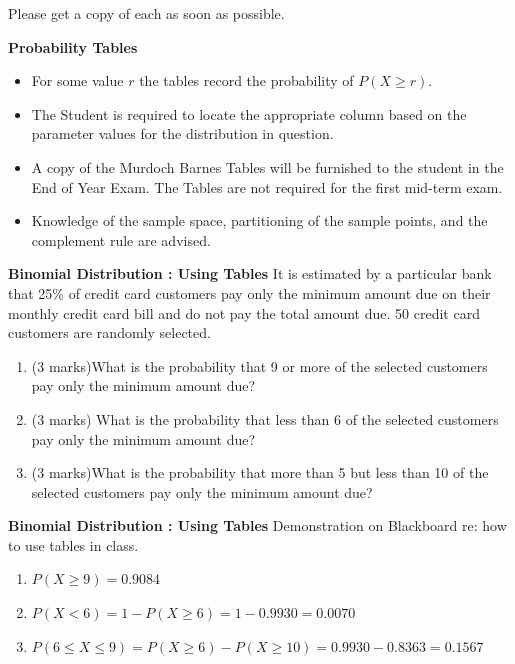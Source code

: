 \documentclass[]{report}
\begin{document}
{{Please get a copy of each as soon as possible.

}

{
\textbf{Probability Tables}
\begin{itemize}
\item  For some value $r$ the tables record the probability of $P(X \geq r)$.
\item  The Student is required to locate the appropriate column based on the parameter values for the distribution in question.
\item  A copy of the Murdoch Barnes Tables will be furnished to the student in the End of Year Exam. The Tables are not required for the first mid-term exam.
\item  Knowledge of the sample space, partitioning of the sample points, and the complement rule are advised.
\end{itemize}
}


{
\textbf{Binomial Distribution : Using Tables}
It is estimated by a particular bank that 25\% of credit card customers pay only the minimum amount due on their monthly credit card bill and do not pay the total amount due. 50 credit card customers are randomly selected.
\begin{enumerate}
\item  (3 marks)What is the probability that 9 or more of the selected customers pay only the minimum amount due?
\item  (3 marks) What is the probability that less than 6 of the selected customers pay only the minimum amount due?
\item  (3 marks)What is the probability that more than 5 but less than 10 of the selected customers pay only the minimum amount due?
\end{enumerate}

}

{
\textbf{Binomial Distribution : Using Tables}
Demonstration on Blackboard re: how to use tables in class.
\begin{enumerate}
\item  $P(X \geq 9) = 0.9084$
\item  $P(X < 6) = 1- P(X \geq 6) =1 - 0.9930 = 0.0070$
\item  $P(6 \leq X \leq 9) = P(X \geq 6) - P(X \geq 10) = 0.9930 - 0.8363 = 0.1567$
\end{enumerate}

}}
\end{document}
